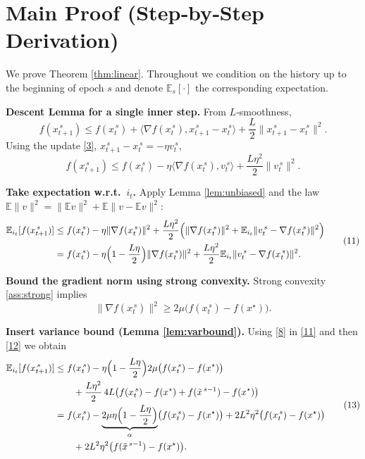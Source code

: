 \documentclass[11pt]{article}
\begin{document}
\section*{Main Proof (Step‑by‑Step Derivation)}
We prove Theorem \ref{thm:linear}.  Throughout we condition on the history up to the beginning of epoch $s$ and denote $\mathbb{E}_s[\cdot]$ the corresponding expectation.

\begin{enumerate}[label={[\textbf{Step \arabic*}]}]
\item \textbf{Descent Lemma for a single inner step.}  
From $L$‑smoothness,
\[
f(x_{t+1}^{\,s})\le f(x_t^{\,s})+\langle\nabla f(x_t^{\,s}),x_{t+1}^{\,s}-x_t^{\,s}\rangle
+\frac{L}{2}\|x_{t+1}^{\,s}-x_t^{\,s}\|^2 .
\tag{9}
\]
Using the update \eqref{3}, $x_{t+1}^{\,s}-x_t^{\,s}=-\eta v_t^{\,s}$,
\[
f(x_{t+1}^{\,s})\le f(x_t^{\,s})-\eta\langle\nabla f(x_t^{\,s}),v_t^{\,s}\rangle
+\frac{L\eta^{2}}{2}\|v_t^{\,s}\|^{2}.
\tag{10}
\]

\item \textbf{Take expectation w.r.t.\ $i_t$.}  
Apply Lemma \ref{lem:unbiased} and the law $\mathbb{E}\|v\|^{2}=\|\mathbb{E}v\|^{2}+\mathbb{E}\|v-\mathbb{E}v\|^{2}$:
\[
\begin{aligned}
\mathbb{E}_{i_t}[f(x_{t+1}^{\,s})]
&\le f(x_t^{\,s})-\eta\|\nabla f(x_t^{\,s})\|^{2}
+\frac{L\eta^{2}}{2}\Bigl(\|\nabla f(x_t^{\,s})\|^{2}
+\mathbb{E}_{i_t}\|v_t^{\,s}-\nabla f(x_t^{\,s})\|^{2}\Bigr)\\
&= f(x_t^{\,s})-\eta\Bigl(1-\frac{L\eta}{2}\Bigr)\|\nabla f(x_t^{\,s})\|^{2}
+\frac{L\eta^{2}}{2}\mathbb{E}_{i_t}\|v_t^{\,s}-\nabla f(x_t^{\,s})\|^{2}.
\end{aligned}
\tag{11}
\]

\item \textbf{Bound the gradient norm using strong convexity.}  
Strong convexity \eqref{ass:strong} implies
\[
\|\nabla f(x_t^{\,s})\|^{2}\ge 2\mu\bigl(f(x_t^{\,s})-f(x^\star)\bigr).
\tag{12}
\]

\item \textbf{Insert variance bound (Lemma \ref{lem:varbound}).}  
Using \eqref{8} in \eqref{11} and then \eqref{12} we obtain
\[
\begin{aligned}
\mathbb{E}_{i_t}[f(x_{t+1}^{\,s})]
&\le f(x_t^{\,s})-\eta\Bigl(1-\frac{L\eta}{2}\Bigr) 2\mu\bigl(f(x_t^{\,s})-f(x^\star)\bigr)\\
&\qquad+ \frac{L\eta^{2}}{2}\,4L\bigl(f(x_t^{\,s})-f(x^\star)+f(\tilde{x}^{\,s-1})-f(x^\star)\bigr)\\
&= f(x_t^{\,s})-\underbrace{2\mu\eta\Bigl(1-\frac{L\eta}{2}\Bigr)}_{\alpha}
\bigl(f(x_t^{\,s})-f(x^\star)\bigr)
+2L^{2}\eta^{2}\bigl(f(x_t^{\,s})-f(x^\star)\bigr)\\
&\qquad+2L^{2}\eta^{2}\bigl(f(\tilde{x}^{\,s-1})-f(x^\star)\bigr).
\end{aligned}
\tag{13}
\]


\end{enumerate}
\end{document}
